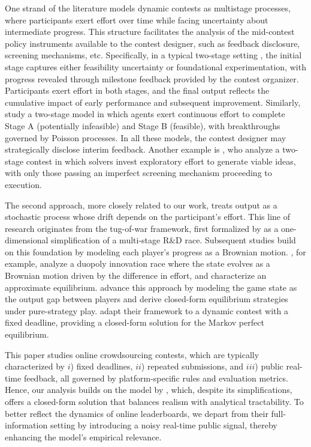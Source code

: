 \documentclass[mnsc]{informs3}
\begin{document}
One strand of the literature models dynamic contests as multistage processes, where participants exert effort over time while facing uncertainty about intermediate progress.
This structure facilitates the analysis of the mid-contest policy instruments available to the contest designer, such as feedback disclosure, screening mechanisms, etc.
Specifically, in a typical two-stage setting \citep{aoyagi2010information, mihm2019feedback}, the initial stage captures either feasibility uncertainty or foundational experimentation, with progress revealed through milestone feedback provided by the contest organizer. 
Participants exert effort in both stages, and the final output reflects the cumulative impact of early performance and subsequent improvement.
Similarly, \citet{bimpikis2019designing} study a two-stage model in which agents exert continuous effort to complete Stage A (potentially infeasible) and Stage B (feasible), with breakthroughs governed by Poisson processes.
In all these models, the contest designer may strategically disclose interim feedback.
Another example is \citet{Khorasani2023screening}, who analyze a two-stage contest in which solvers invest exploratory effort to generate viable ideas, with only those passing an imperfect screening mechanism proceeding to execution.

The second approach, more closely related to our work, treats output as a stochastic process whose drift depends on the participant’s effort.
This line of research originates from the tug-of-war framework, first formalized by \citet{Harris1987Race} as a one-dimensional simplification of a multi-stage R\&D race.
Subsequent studies build on this foundation by modeling each player’s progress as a Brownian motion.
\citet{budd1993Duopoly}, for example, analyze a duopoly innovation race where the state evolves as a Brownian motion driven by the difference in effort, and characterize an approximate equilibrium.
\citet{Moscarini2007Contest} advance this approach by modeling the game state as the output gap between players and derive closed-form equilibrium strategies under pure-strategy play.
\citet{Ryvkin2022Fight} adapt their framework to a dynamic contest with a fixed deadline, providing a closed-form solution for the Markov perfect equilibrium.


This paper studies online crowdsourcing contests, which are typically characterized by 
$i$) fixed deadlines, 
$ii$) repeated submissions, and 
$iii$) public real-time feedback,
all governed by platform-specific rules and evaluation metrics.
Hence, our analysis builds on the model by \citet{Ryvkin2022Fight}, which, despite its simplifications, offers a closed-form solution that balances realism with analytical tractability. 
To better reflect the dynamics of online leaderboards, we depart from their full-information setting by introducing a noisy real-time public signal, thereby enhancing the model’s empirical relevance.
\end{document}
